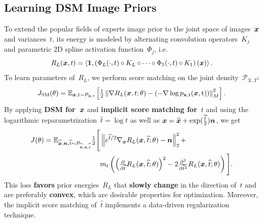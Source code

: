 \documentclass[a1paper,fleqn]{betterportraitposter}
\renewcommand{\emph}[1]{\textbf{\color{myblue}#1}}
\newcommand{\norm}[1]{\left\Vert#1\right\Vert}
\newcommand{\scal}[2]{\left\langle#1,#2\right\rangle}
\renewcommand{\vec}[1]{\mathbf{#1}}
\newcommand{\dist}[1]{\mathcal{P}_{#1}}
\theoremstyle{plain}
\begin{document}
{\begin{multicols}{2}
\section{Learning DSM Image Priors}
To extend the popular fields of experts image prior to the joint space of images~${\bm{x}}$ and variances~$t$, its energy is modeled by alternating convolution operators~$K_j$ and parametric 2D spline activation function~$\Phi_j$, i.e.
\[
R_L(\vx,t) = \scal{\vec{1}}{\left(\Phi_L(\cdot,t)\circ K_L\circ\cdots\circ\Phi_1(\cdot, t) \circ K_1\right)(\vx)}.
\]
To learn parameters of~$R_L$, we perform score matching on the joint density~$\dist{X,T}$:
\[
J_\mathrm{SM}(\theta)=\E_{\vx,t\sim\dist{\rvx,\rt}}\left[\tfrac12\norm{\nabla R_L(\vx,t;\theta) -\left(- \nabla\log p_{\rvx,\rt}(\vx,\rt)\right)}_M^2\right].
\]
By applying \emph{DSM for~${\bm{x}}$} and \emph{implicit score matching for~$t$} and using the logarithmic reparametrization~$\widehat{t}=\log t$ as well as ${\bm{x}}=\widehat{{\bm{x}}}+\exp(\tfrac{\widehat{t}}{2}){\bm{n}}$, we get
\begin{align*}    
J(\theta)=\E_{\widehat{\vx},\vn,\widehat{t}\sim\dist{\widehat{\rvx},\rvn,\widehat{\rt}}}\tfrac12\Bigg[&\norm{e^{\widehat{t}/2}\nabla_\vx R_L(\vx,\widehat{t};\theta) -\vn}_2^2+\\
&m_t\left(\left(\tfrac{\partial}{\partial\widehat{t}}R_L(\vx,\widehat{t};\theta)\right)^2 -2\tfrac{\partial^2}{\partial \widehat{t}^2}R_L(\vx,\widehat{t};\theta)\right)\Bigg].
\end{align*}
This loss \emph{favors} prior energies~$R_L$ that \emph{slowly change} in the direction of~$t$ and are preferably \emph{convex}, which are desirable properties for optimization.
Moreover, the implicit score matching of~$\widehat{t}$ implements a data-driven regularization technique. 
\vspace*{-1em}
\begin{center}
\end{center}
\end{multicols}}
\end{document}
